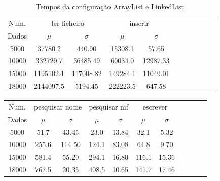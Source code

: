 \documentclass[a5paper,twocolumn, 11pt]{article}
\begin{document}
\clearpage
\onecolumn
\begin{center}
    \begin{table}[h!b!t!]
    \begin{center}
    \caption{Tempos da configuração ArrayList e LinkedList}
\begin{tabular}{ | *{11}{c|} }
\hline
    Num. & \multicolumn{2}{|c|}{ler ficheiro} & \multicolumn{2}{|c|}{inserir}\\ %
    
    Dados & $\mu$ & $\sigma$ & $\mu$ & $\sigma$\\ \hline
    5000 & 37780.2 & 440.90 & 15308.1 & 57.65\\ \hline
    10000 & 332729.7 & 36485.49 & 60034.0 & 12987.33\\ \hline
    15000 & 1195102.1 & 117008.82 & 149284.1 & 11049.01\\ \hline
    18000 & 2144097.5 & 5194.45 & 222223.5 & 647.58\\ \hline
\end{tabular}
\end{center}
\end{table}
\begin{tabular}{ | *{11}{c|} }
\hline
    Num. & \multicolumn{2}{|c|}{pesquisar nome} & \multicolumn{2}{|c|}{pesquisar nif} & \multicolumn{2}{|c|}{escrever}\\ %
    
    Dados & $\mu$ & $\sigma$ & $\mu$ & $\sigma$ & $\mu$ & $\sigma$\\ \hline
    5000 & 51.7 & 43.45 & 23.0 & 13.84 & 32.1 & 5.32\\ \hline
    10000 & 255.6 & 114.50 & 124.1 & 83.08 & 64.8 & 9.70\\ \hline
    15000 & 581.4 & 55.20 & 294.1 & 16.80 & 116.1 & 15.36\\ \hline
    18000 & 767.5 & 20.35 & 408.5 & 10.65 & 141.7 & 17.46\\ \hline
\end{tabular}
\end{center}
\end{document}
